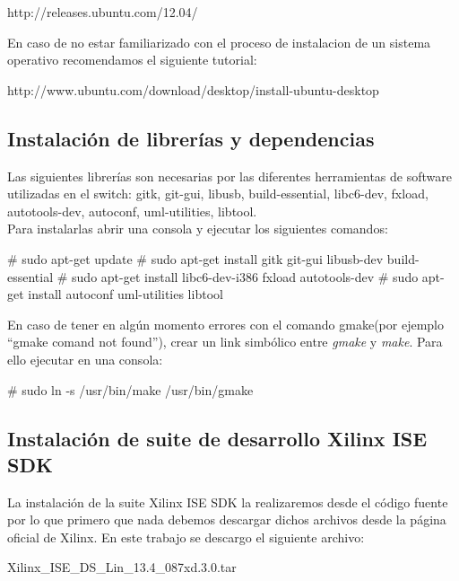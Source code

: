 \begin{center}
http://releases.ubuntu.com/12.04/
\end{center}  

En caso de no estar familiarizado con el proceso de instalacion de un sistema operativo recomendamos el siguiente tutorial:

\begin{center}
http://www.ubuntu.com/download/desktop/install-ubuntu-desktop
\end{center}

\subsection{Instalación de librerías y dependencias}
Las siguientes librerías son necesarias por las diferentes herramientas de software utilizadas en el switch: gitk, git-gui, libusb, build-essential, libc6-dev, fxload, autotools-dev, autoconf, uml-utilities, libtool.\\

Para instalarlas abrir una consola y ejecutar los siguientes comandos:\\

\begin{bash}
# sudo apt-get update
# sudo apt-get install gitk git-gui libusb-dev build-essential 
# sudo apt-get install libc6-dev-i386 fxload autotools-dev
# sudo apt-get install autoconf uml-utilities libtool
\end{bash}

En caso de tener en algún momento errores con el comando gmake(por ejemplo “gmake comand not found”), crear un link simbólico entre \textit{gmake} y \textit{make}. Para ello ejecutar en una consola:\\

\begin{bash}
# sudo ln -s /usr/bin/make /usr/bin/gmake
\end{bash}

\subsection{Instalación de suite de desarrollo Xilinx ISE SDK}

La instalación de la suite Xilinx ISE SDK la realizaremos desde el código fuente por lo que primero que nada debemos descargar dichos archivos desde la página oficial de Xilinx. En este trabajo se descargo el siguiente archivo:

\begin{center}
Xilinx\_ISE\_DS\_Lin\_13.4\_087xd.3.0.tar
\end{center}

